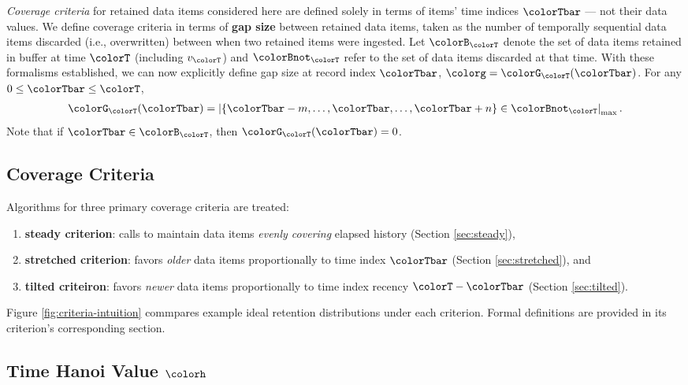 \textit{Coverage criteria} for retained data items considered here are defined solely in terms of items' time indices $\colorTbar$ --- not their data values.
We define coverage criteria in terms of \textbf{gap size} between retained data items, taken as the number of temporally sequential data items discarded (i.e., overwritten) between when two retained items were ingested.
Let $\colorB_{\colorT}$ denote the set of data items retained in buffer at time $\colorT$ (including $v_{\colorT}$) and $\colorBnot_{\colorT}$ refer to the set of data items discarded at that time.
With these formalisms established, we can now explicitly define gap size at record index $\colorTbar$, $\colorg = \colorG_{\colorT}(\colorTbar)$.
For any $0 \leq \colorTbar \leq \colorT$,
\begin{align*}
\colorG_{\colorT}(\colorTbar) = \left| \{\colorTbar - m, \ldots, \colorTbar, \ldots, \colorTbar+n\} \in \colorBnot_{\colorT} \right|_\mathrm{max}.
\end{align*}
Note that if $\colorTbar \in \colorB_{\colorT}$, then $\colorG_{\colorT}(\colorTbar) = 0$.

\subsection{Coverage Criteria}
\label{sec:notation-coverage}

Algorithms for three primary coverage criteria are treated:
\begin{enumerate}
\item \textbf{steady criterion}: calls to maintain data items \textit{evenly covering} elapsed history (Section \ref{sec:steady}),
\item \textbf{stretched criterion}: favors \textit{older} data items proportionally to time index $\colorTbar$ (Section \ref{sec:stretched}), and
\item \textbf{tilted criteiron}: favors \textit{newer} data items proportionally to time index recency $\colorT - \colorTbar$ (Section \ref{sec:tilted}).
\end{enumerate}
Figure \ref{fig:criteria-intuition} commpares example ideal retention distributions under each criterion.
Formal definitions are provided in its criterion's corresponding section.

\subsection{Time Hanoi Value $\colorh$}
\label{sec:notation-hanoi}


